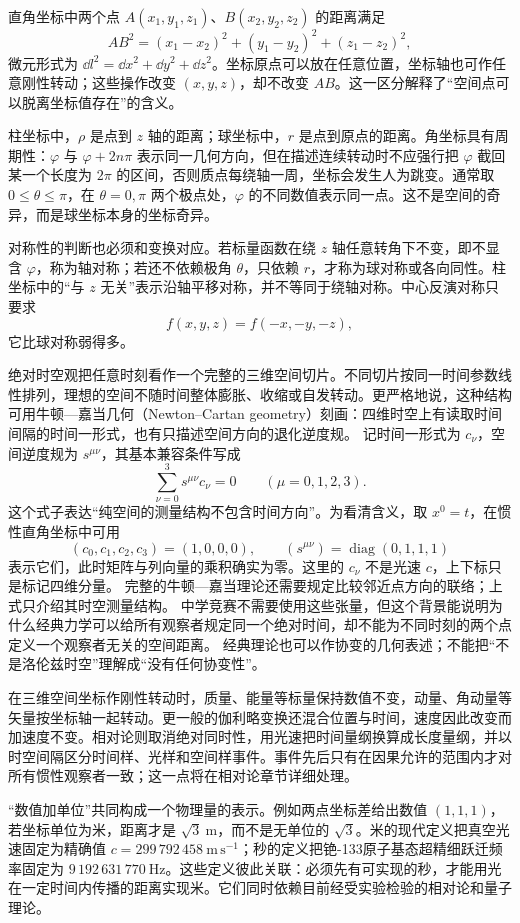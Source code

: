 直角坐标中两个点 $A(x_1,y_1,z_1)$、$B(x_2,y_2,z_2)$ 的距离满足
\[
  AB^2=(x_1-x_2)^2+(y_1-y_2)^2+(z_1-z_2)^2,
\]
微元形式为 $\dd l^2=\dd x^2+\dd y^2+\dd z^2$。坐标原点可以放在任意位置，坐标轴也可作任意刚性转动；这些操作改变 $(x,y,z)$，却不改变 $AB$。这一区分解释了“空间点可以脱离坐标值存在”的含义。

柱坐标中，$\rho$ 是点到 $z$ 轴的距离；球坐标中，$r$ 是点到原点的距离。角坐标具有周期性：$\varphi$ 与 $\varphi+2n\pi$ 表示同一几何方向，但在描述连续转动时不应强行把 $\varphi$ 截回某一个长度为 $2\pi$ 的区间，否则质点每绕轴一周，坐标会发生人为跳变。通常取 $0\leq\theta\leq\pi$，在 $\theta=0,\pi$ 两个极点处，$\varphi$ 的不同数值表示同一点。这不是空间的奇异，而是球坐标本身的坐标奇异。

对称性的判断也必须和变换对应。若标量函数在绕 $z$ 轴任意转角下不变，即不显含 $\varphi$，称为轴对称；若还不依赖极角 $\theta$，只依赖 $r$，才称为球对称或各向同性。柱坐标中的“与 $z$ 无关”表示沿轴平移对称，并不等同于绕轴对称。中心反演对称只要求
\[
  f(x,y,z)=f(-x,-y,-z),
\]
它比球对称弱得多。

绝对时空观把任意时刻看作一个完整的三维空间切片。不同切片按同一时间参数线性排列，理想的空间不随时间整体膨胀、收缩或自发转动。更严格地说，这种结构可用牛顿—嘉当几何（Newton--Cartan geometry）刻画：四维时空上有读取时间间隔的时间一形式，也有只描述空间方向的退化逆度规。
记时间一形式为 $c_\nu$，空间逆度规为 $s^{\mu\nu}$，其基本兼容条件写成
\[
  \sum_{\nu=0}^{3}s^{\mu\nu}c_\nu=0\qquad(\mu=0,1,2,3).
\]
这个式子表达“纯空间的测量结构不包含时间方向”。为看清含义，取 $x^0=t$，在惯性直角坐标中可用
\[
  (c_0,c_1,c_2,c_3)=(1,0,0,0),\qquad
  (s^{\mu\nu})=\operatorname{diag}(0,1,1,1)
\]
表示它们，此时矩阵与列向量的乘积确实为零。这里的 $c_\nu$ 不是光速 $c$，上下标只是标记四维分量。
完整的牛顿—嘉当理论还需要规定比较邻近点方向的联络；上式只介绍其时空测量结构。
中学竞赛不需要使用这些张量，但这个背景能说明为什么经典力学可以给所有观察者规定同一个绝对时间，却不能为不同时刻的两个点定义一个观察者无关的空间距离。
经典理论也可以作协变的几何表述；不能把“不是洛伦兹时空”理解成“没有任何协变性”。

在三维空间坐标作刚性转动时，质量、能量等标量保持数值不变，动量、角动量等矢量按坐标轴一起转动。更一般的伽利略变换还混合位置与时间，速度因此改变而加速度不变。相对论则取消绝对同时性，用光速把时间量纲换算成长度量纲，并以时空间隔区分时间样、光样和空间样事件。事件先后只有在因果允许的范围内才对所有惯性观察者一致；这一点将在相对论章节详细处理。

“数值加单位”共同构成一个物理量的表示。例如两点坐标差给出数值 $(1,1,1)$，若坐标单位为米，距离才是 $\sqrt3\ \mathrm m$，而不是无单位的 $\sqrt3$。米的现代定义把真空光速固定为精确值
$c=299\,792\,458\ \mathrm{m\,s^{-1}}$；秒的定义把铯-133原子基态超精细跃迁频率固定为
$9\,192\,631\,770\ \mathrm{Hz}$。这些定义彼此关联：必须先有可实现的秒，才能用光在一定时间内传播的距离实现米。它们同时依赖目前经受实验检验的相对论和量子理论。

